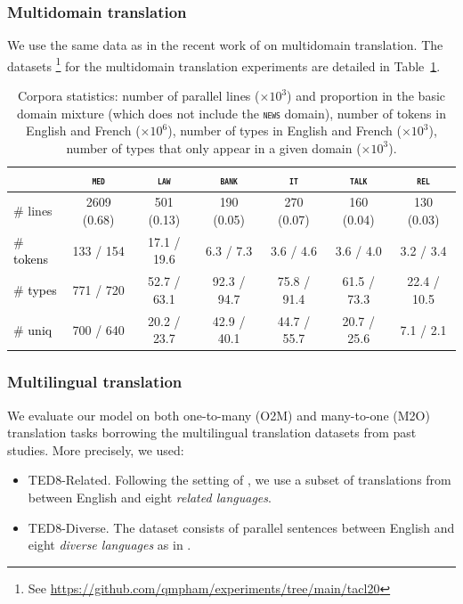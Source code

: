 \documentclass[11pt]{article}
\newcommand{\fyDone}[1]{\done[FY]\Todo[FY:]{\textcolor{orange}{#1}}}
\newcommand{\revisiondone}[1]{\textcolor{black}{#1}}
\newcommand{\domain}[1]{\texttt{\textsc{#1}}}
\begin{document}
\subsubsection{Multidomain translation}
We use the same data as in the recent work of \citet{Pham21revisiting} on multidomain translation.\fyDone{Add public to the data link} The datasets \footnote{See \url{https://github.com/qmpham/experiments/tree/main/tacl20}} for the multidomain translation experiments are detailed in Table~\ref{tab:Corpora-chap4}.
\begin{table}[h!]
  \centering
  \begin{tabular}{|l|cccccc|} %
    \cline{2-7} 
    \multicolumn{1}{c|}{} & \multicolumn{1}{c}{\domain{med}} & \multicolumn{1}{c}{\domain{law}} & \multicolumn{1}{c}{\domain{bank}} & \multicolumn{1}{c}{\domain{it}} & \multicolumn{1}{c}{\domain{talk}} & \multicolumn{1}{c}{\domain{rel}} \\
    \hline 
    \# lines & 2609 (0.68) & 501 (0.13) & 190 (0.05) & 270 (0.07) & 160 (0.04) & 130 (0.03) \\
    \# \revisiondone{tokens}  &  133 / 154  &  17.1 / 19.6 &  6.3 / 7.3 &  3.6 / 4.6 &  3.6 / 4.0 &  3.2 / 3.4 \\
    \# \revisiondone{types}  & 771 / 720 & 52.7 / 63.1 & 92.3 / 94.7 & 75.8 / 91.4 & 61.5 / 73.3 & 22.4 / 10.5 \\
    \# \revisiondone{uniq} & 700 / 640 & 20.2 / 23.7 & 42.9 / 40.1 & 44.7 / 55.7 & 20.7 / 25.6 & 7.1 / 2.1 \\
    \hline
  \end{tabular}
  \caption{Corpora statistics: number of parallel lines ($\times 10^3$) and proportion in the basic domain mixture (which does not include the \domain{news} domain), number of tokens in English and French ($\times 10^6$), number of types in English and French ($\times 10^3$), number of types that only appear in a given domain ($\times 10^3$).}
\label{tab:Corpora-chap4}
\end{table}
\subsubsection{Multilingual translation}
We evaluate our model on both one-to-many (O2M) and many-to-one (M2O)
translation tasks borrowing the multilingual translation datasets from past studies. More precisely, we used: 
\begin{itemize}
\item TED8-Related. Following the setting of \citet{Wang20balancing}, we use a subset of translations from \citet{qi18when} between English and eight \emph{related languages}.
\item TED8-Diverse. The dataset consists of parallel sentences between English and eight \emph{diverse languages} as in \citet{Wang20balancing}.
\end{itemize}
\end{document}
